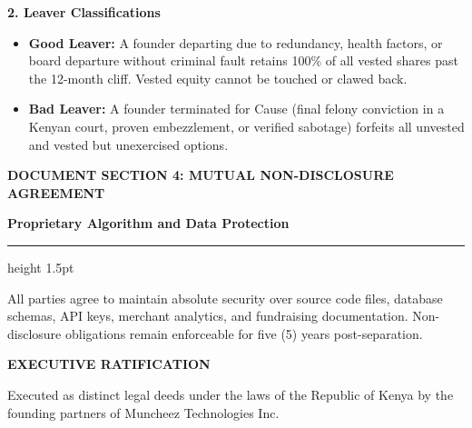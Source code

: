\documentclass[11pt,a4paper]{article}
\begin{document}
\textbf{\color{CorporateNavy} 2. Leaver Classifications}
\begin{itemize}
    \item \textbf{Good Leaver:} A founder departing due to redundancy, health factors, or board departure without criminal fault retains 100\% of all vested shares past the 12-month cliff. Vested equity cannot be touched or clawed back.
    \item \textbf{Bad Leaver:} A founder terminated for Cause (final felony conviction in a Kenyan court, proven embezzlement, or verified sabotage) forfeits all unvested and vested but unexercised options.
\end{itemize}

\newpage

{\fontsize{18}{22}\sffamily\bfseries\color{CorporateNavy} DOCUMENT SECTION 4: MUTUAL NON-DISCLOSURE AGREEMENT}

\vspace{0.1cm}
\textsf{\small\bfseries\color{LinkBlue} Proprietary Algorithm and Data Protection}
\vspace{0.2cm}
\color{RuleNavy}\hrule height 1.5pt
\vspace{0.4cm}

All parties agree to maintain absolute security over source code files, database schemas, API keys, merchant analytics, and fundraising documentation. Non-disclosure obligations remain enforceable for five (5) years post-separation.

\vspace{2.5cm}

{\fontsize{14}{18}\sffamily\bfseries\color{CorporateNavy} EXECUTIVE RATIFICATION}

\vspace{0.2cm}
\textsf{\small\color{SolidBlack} Executed as distinct legal deeds under the laws of the Republic of Kenya by the founding partners of Muncheez Technologies Inc.}

\vspace{2.0cm}
\end{document}
